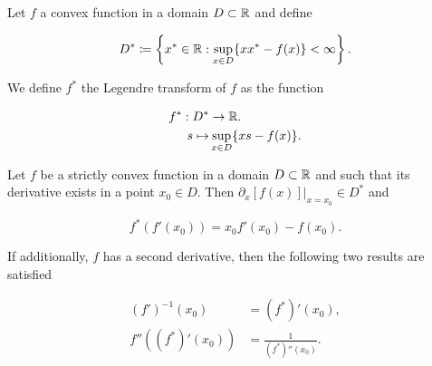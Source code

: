\begin{definition}
    Let $f$ a convex function in a domain $D\subset \mathbb R$ and define

    \begin{equation} \label{eq:legendre_set}
        D^* \coloneqq \left\{ x^* \in \mathbb R \mathrel{:} \sup_{x \in D} \{xx^* - f(x)\} < \infty \right\}.
    \end{equation}

    We define $f^*$ the Legendre transform of $f$ as the function

    \begin{align*}
        f^* : D^* &\to \mathbb R.\\
        s \mapsto &\sup_{x \in D} \{ xs - f(x) \}.
    \end{align*}
\end{definition}

\begin{lemma} \label{lemma:strictly_convex}
    Let $f$ be a strictly convex function in a domain $D \subset \mathbb R$ and such that its derivative exists in a point $x_0 \in D$. Then $\left.\partial_x [f(x)]\right|_{x=x_0} \in D^*$ and 

    \begin{equation*}
        f^*(f'(x_0)) = x_0 f'(x_0) - f(x_0).
    \end{equation*}

    If additionally, $f$ has a second derivative, then the following two results are satisfied

    \begin{align*}
        (f')^{-1}(x_0) &= (f^*)'(x_0), \\
        f''((f^*)'(x_0)) &= \frac{1}{(f^*)''(x_0)}.
    \end{align*}
\end{lemma}


